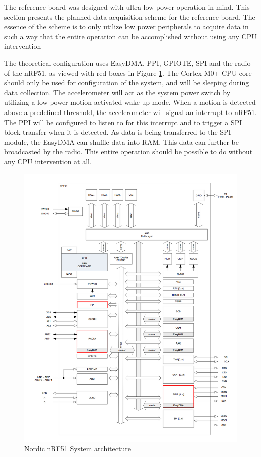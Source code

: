The reference board was designed with ultra low power operation in mind. This section presents the planned data acquisition scheme for the reference board. The essence of the scheme is to only utilize low power peripherals to acquire data in such a way that the entire operation can be accomplished without using any CPU intervention  

The theoretical configuration uses EasyDMA, PPI, GPIOTE, SPI and the radio of the nRF51, as viewed with red boxes in Figure \ref{fig:nrf51}. The Cortex-M0+ CPU core should only be used for configuration of the system, and will be sleeping during data collection. The accelerometer will act as the system power switch by utilizing a low power motion activated wake-up mode. When a motion is detected above a predefined threshold, the accelerometer will signal an interrupt to nRF51. The PPI will be configured to listen to for this interrupt and to trigger a SPI block transfer when it is detected. As data is being transferred to the SPI module, the EasyDMA can shuffle data into RAM. This data can further be broadcasted by the radio. This entire operation should be possible to do without any CPU intervention at all.

\begin{figure}[h]
\centering
\includegraphics[scale=0.5]{fig/nrf51822_edit.png}
\caption{Nordic nRF51 System architecture \cite{nrf51}}
\label{fig:nrf51}
\end{figure}